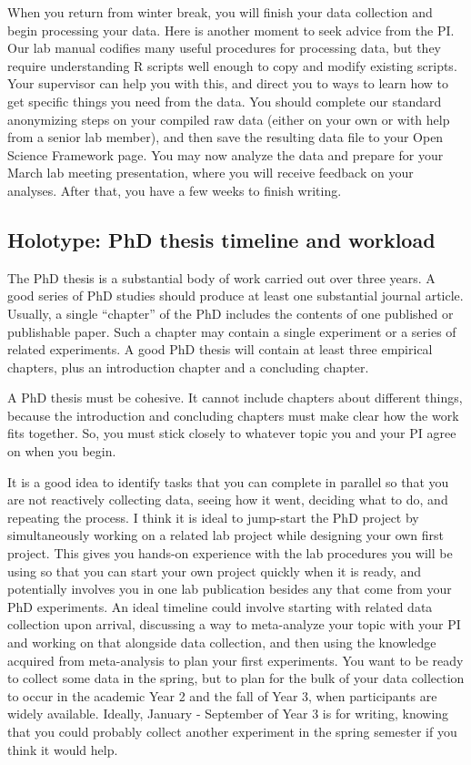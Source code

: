 \documentclass[12pt,]{book}
\theoremstyle{definition}
\theoremstyle{definition}
\theoremstyle{definition}
\theoremstyle{remark}
\begin{document}
When you return from winter break, you will finish your data collection
and begin processing your data. Here is another moment to seek advice
from the PI. Our lab manual codifies many useful procedures for
processing data, but they require understanding R scripts well enough to
copy and modify existing scripts. Your supervisor can help you with
this, and direct you to ways to learn how to get specific things you
need from the data. You should complete our standard anonymizing steps
on your compiled raw data (either on your own or with help from a senior
lab member), and then save the resulting data file to your Open Science
Framework page. You may now analyze the data and prepare for your March
lab meeting presentation, where you will receive feedback on your
analyses. After that, you have a few weeks to finish writing.

\subsection{Holotype: PhD thesis timeline and
workload}\label{holotype-phd-thesis-timeline-and-workload}

The PhD thesis is a substantial body of work carried out over three
years. A good series of PhD studies should produce at least one
substantial journal article. Usually, a single ``chapter'' of the PhD
includes the contents of one published or publishable paper. Such a
chapter may contain a single experiment or a series of related
experiments. A good PhD thesis will contain at least three empirical
chapters, plus an introduction chapter and a concluding chapter.

A PhD thesis must be cohesive. It cannot include chapters about
different things, because the introduction and concluding chapters must
make clear how the work fits together. So, you must stick closely to
whatever topic you and your PI agree on when you begin.

It is a good idea to identify tasks that you can complete in parallel so
that you are not reactively collecting data, seeing how it went,
deciding what to do, and repeating the process. I think it is ideal to
jump-start the PhD project by simultaneously working on a related lab
project while designing your own first project. This gives you hands-on
experience with the lab procedures you will be using so that you can
start your own project quickly when it is ready, and potentially
involves you in one lab publication besides any that come from your PhD
experiments. An ideal timeline could involve starting with related data
collection upon arrival, discussing a way to meta-analyze your topic
with your PI and working on that alongside data collection, and then
using the knowledge acquired from meta-analysis to plan your first
experiments. You want to be ready to collect some data in the spring,
but to plan for the bulk of your data collection to occur in the
academic Year 2 and the fall of Year 3, when participants are widely
available. Ideally, January - September of Year 3 is for writing,
knowing that you could probably collect another experiment in the spring
semester if you think it would help.
\end{document}
